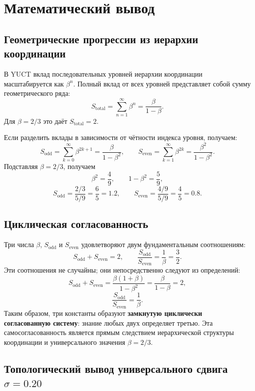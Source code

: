 \documentclass[12pt,a4paper]{article}
\begin{document}
	\section{Математический вывод}
	
	\subsection{Геометрические прогрессии из иерархии координации}
	В YUCT вклад последовательных уровней иерархии координации масштабируется как \(\beta^n\). Полный вклад от всех уровней представляет собой сумму геометрического ряда:
	\[
	S_{\text{total}} = \sum_{n=1}^{\infty} \beta^n = \frac{\beta}{1-\beta}.
	\]
	Для \(\beta = 2/3\) это даёт \(S_{\text{total}} = 2\).
	
	Если разделить вклады в зависимости от чётности индекса уровня, получаем:
	\[
	S_{\text{odd}} = \sum_{k=0}^{\infty} \beta^{2k+1} = \frac{\beta}{1-\beta^2},
	\qquad
	S_{\text{even}} = \sum_{k=1}^{\infty} \beta^{2k} = \frac{\beta^2}{1-\beta^2}.
	\]
	Подставляя \(\beta = 2/3\), получаем
	\[
	\beta^2 = \frac{4}{9},\qquad 1-\beta^2 = \frac{5}{9},
	\]
	\[
	S_{\text{odd}} = \frac{2/3}{5/9} = \frac{6}{5}=1.2,\qquad
	S_{\text{even}} = \frac{4/9}{5/9} = \frac{4}{5}=0.8.
	\]
	
	\subsection{Циклическая согласованность}
	Три числа \(\beta\), \(S_{\text{odd}}\) и \(S_{\text{even}}\) удовлетворяют двум фундаментальным соотношениям:
	\[
	S_{\text{odd}} + S_{\text{even}} = 2,\qquad
	\frac{S_{\text{odd}}}{S_{\text{even}}} = \frac{1}{\beta} = \frac{3}{2}.
	\]
	Эти соотношения не случайны; они непосредственно следуют из определений:
	\[
	S_{\text{odd}} + S_{\text{even}} = \frac{\beta(1+\beta)}{1-\beta^2} = \frac{\beta}{1-\beta}=2,
	\]
	\[
	\frac{S_{\text{odd}}}{S_{\text{even}}} = \frac{1}{\beta}.
	\]
	Таким образом, три константы образуют \textbf{замкнутую циклически согласованную систему}: знание любых двух определяет третью. Эта самосогласованность является прямым следствием иерархической структуры координации и универсального значения \(\beta=2/3\).
	
	\subsection{Топологический вывод универсального сдвига \(\sigma = 0.20\)}
	\label{sec:sigma_topology}
	
\end{document}
